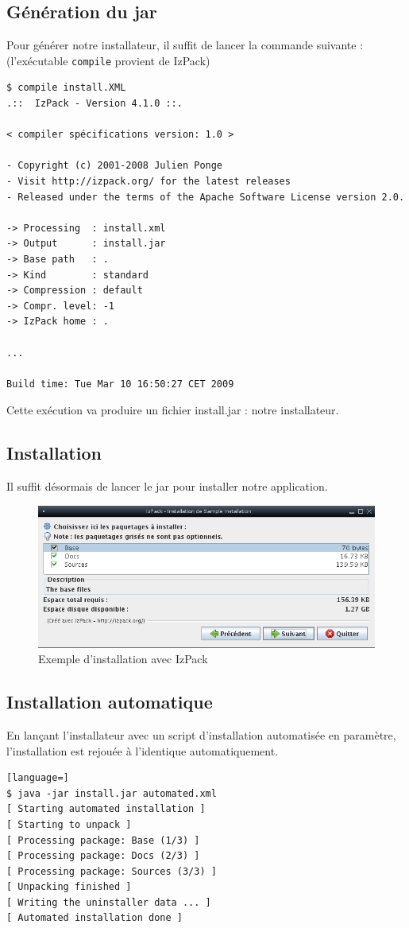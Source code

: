 \subsection{Génération du jar}
Pour générer notre installateur, il suffit de lancer la commande suivante : (l'exécutable \verb|compile| provient de IzPack)
\begin{lstlisting}[language=text]
$ compile install.XML
.::  IzPack - Version 4.1.0 ::.

< compiler spécifications version: 1.0 >

- Copyright (c) 2001-2008 Julien Ponge
- Visit http://izpack.org/ for the latest releases
- Released under the terms of the Apache Software License version 2.0.

-> Processing  : install.xml
-> Output      : install.jar
-> Base path   : .
-> Kind        : standard
-> Compression : default
-> Compr. level: -1
-> IzPack home : .

...

Build time: Tue Mar 10 16:50:27 CET 2009
\end{lstlisting}
Cette exécution va produire un fichier install.jar : notre installateur.
\subsection{Installation}
Il suffit désormais de lancer le jar pour installer notre application.
\begin{figure}[H]
	\centering
	\includegraphics[width=15cm]{../image/installSample.png}
	\caption{Exemple d'installation avec IzPack}
\end{figure}

\subsection{Installation automatique}
En lançant l'installateur avec un script d'installation automatisée en paramètre, l'installation est rejouée à l'identique automatiquement.
\begin{lstlisting}[language=]
$ java -jar install.jar automated.xml
[ Starting automated installation ]
[ Starting to unpack ]
[ Processing package: Base (1/3) ]
[ Processing package: Docs (2/3) ]
[ Processing package: Sources (3/3) ]
[ Unpacking finished ]
[ Writing the uninstaller data ... ]
[ Automated installation done ]
\end{lstlisting}

